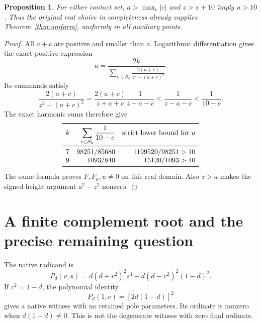 \documentclass[11pt,a4paper]{article}
\newtheorem{proposition}[theorem]{Proposition}
\begin{document}
\begin{proposition}\label{prop:physical}
For either contact set, $a>\max_c|c|$ and $z>a+10$ imply $u>10$.
Thus the original real choice in completeness already supplies
Theorem~\ref{thm:uniform}, uniformly in all auxiliary points.
\end{proposition}
\begin{proof}
All $a+c$ are positive and smaller than $z$. Logarithmic
differentiation gives the exact positive expression
\[
 u=\frac{2k}{\displaystyle\sum_{c\in\mathcal S_k}
                     \frac{2(a+c)}{z^2-(a+c)^2}}.
\]
Its summands satisfy
\[
 \frac{2(a+c)}{z^2-(a+c)^2}
 =\frac{2(a+c)}{z+a+c}\frac1{z-a-c}
 <\frac1{z-a-c}<\frac1{10-c}.
\]
The exact harmonic sums therefore give
\[
\begin{array}{crr}
\toprule
k&\displaystyle\sum_{c\in\mathcal S_k}\frac1{10-c}
&\text{strict lower bound for }u\\[2pt]
\midrule
7&98251/85680&1199520/98251>10\\
9&1093/840&15120/1093>10\\
\bottomrule
\end{array}
\]
The same formula proves $F,F_a,u\ne0$ on this real domain.
Also $z>a$ makes the signed height argument $a^2-z^2$ nonzero.
\end{proof}

\section{A finite complement root and the precise remaining question}
The native radicand is
\[
 P_d(v,s)=d(d+v^2)^2s^4-d(d-v^2)^2(1-d)^2.
\]
If $c^2=1-d$, the polynomial identity
\begin{equation}\label{eq:special}
                     P_d(1,c)=[2d(1-d)]^2
\end{equation}
gives a native witness with no retained pole parameters. Its ordinate
is nonzero when $d(1-d)\ne0$. This is not the degenerate witness
with zero final ordinate.
\end{document}
